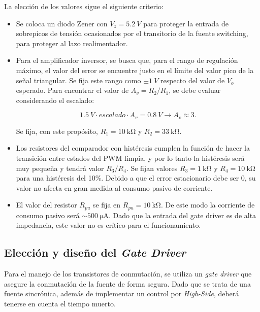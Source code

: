 \documentclass[]{article}
\begin{document}
	La elección de los valores sigue el siguiente criterio:
	\begin{itemize}
		\item Se coloca un diodo Zener con $V_z = \SI{5.2}{V}$ para proteger la entrada de sobrepicos de tensión ocasionados por el transitorio de la fuente switching, para proteger al lazo realimentador.
		
		\item Para el amplificador inversor, se busca que, para el rango de regulación máximo, el valor del error se encuentre justo en el límite del valor pico de la señal triangular. Se fija este rango como $\pm \SI{1}{V}$ respecto del valor de $V_o$ esperado. Para encontrar el valor de $A_v = R_2 / R_1$, se debe evaluar considerando el escalado:
		
		\begin{equation}
			\SI{1.5}{V} \cdot escalado \cdot A_v = \SI{0.8}{V} \to A_v \approx 3.
		\end{equation}
		
		Se fija, con este propósito, $R_1 = \SI{10}{\kilo\ohm}$ y $R_2 = \SI{33}{\kilo\ohm}$.
		
		\item Los resistores del comparador con histéresis cumplen la función de hacer la transición entre estados del PWM limpia, y por lo tanto la histéresis será muy pequeña y tendrá valor $R_3/R_4$. Se fijan valores $R_3 = \SI{1}{\kilo\ohm}$ y $R_4 = \SI{10}{\kilo\ohm}$ para una histéresis del 10\%. Debido a que el error estacionario debe ser 0, su valor no afecta en gran medida al consumo pasivo de corriente.
		
		\item El valor del resistor $R_{pu}$ se fija en $R_{pu} = \SI{10}{\kilo\ohm}$. De este modo la corriente de consumo pasivo será $\sim \SI{500}{\micro\ampere}$. Dado que la entrada del gate driver es de alta impedancia, este valor no es crítico para el funcionamiento.
	\end{itemize}
	
	\subsection{Elección y diseño del \textit{Gate Driver}}
	Para el manejo de los transistores de conmutación, se utiliza un \textit{gate driver} que asegure la conmutación de la fuente de forma segura. Dado que se trata de una fuente sincrónica, además de implementar un control por \textit{High-Side}, deberá tenerse en cuenta el tiempo muerto.
	
\end{document}
